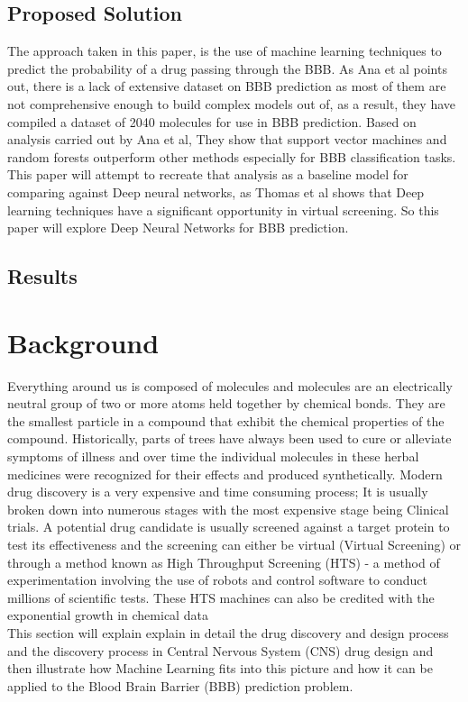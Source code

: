 \documentclass[a4paper,12pt]{report}
\begin{document}
	\section{Proposed Solution}
		The approach taken in this paper, is the use of machine learning techniques to predict the probability of a drug passing 
		through the BBB. As Ana et al \cite{Anaetal2012} points out, there is a lack of extensive dataset on BBB prediction as most of them are not comprehensive enough to build complex models out of, as a result, they have compiled a dataset of 2040 molecules for use in BBB prediction. Based on analysis carried out \cite{Anaetal2012} by Ana et al, They show that support vector machines and random forests outperform other methods especially for BBB classification tasks. This paper will attempt to recreate that analysis as a baseline model for comparing against Deep neural networks, as Thomas et al \cite{Thomasetal2014} shows that Deep learning techniques have a significant opportunity in virtual screening. So this paper will explore Deep Neural Networks for BBB prediction.
	\section{Results}


\chapter{Background}
	Everything around us is composed of molecules and molecules are an electrically neutral group of two or more atoms held together by chemical bonds. They are the smallest particle in a compound that exhibit the chemical properties of the compound. 
	Historically, parts of trees have always been used to cure or alleviate symptoms of illness and over time the individual molecules in these herbal medicines were recognized for their effects and produced synthetically. Modern drug discovery is a very expensive and time consuming process; It is usually broken down into numerous stages with the most expensive stage being Clinical trials. A potential drug candidate is usually screened against a target protein to test its effectiveness and the screening can either be virtual (Virtual Screening) or through a method known as High Throughput Screening (HTS) - a method of experimentation involving the use of robots and control software to conduct millions of scientific tests. These HTS machines can also be credited with the exponential growth in chemical data  \cite{Dougetal2008}
	\\
	This section will explain explain in detail the drug discovery and design process and the discovery process in Central Nervous System (CNS) drug design and then illustrate how Machine Learning fits into this picture and how it can be applied to the Blood Brain Barrier (BBB) prediction problem.
	
\end{document}
